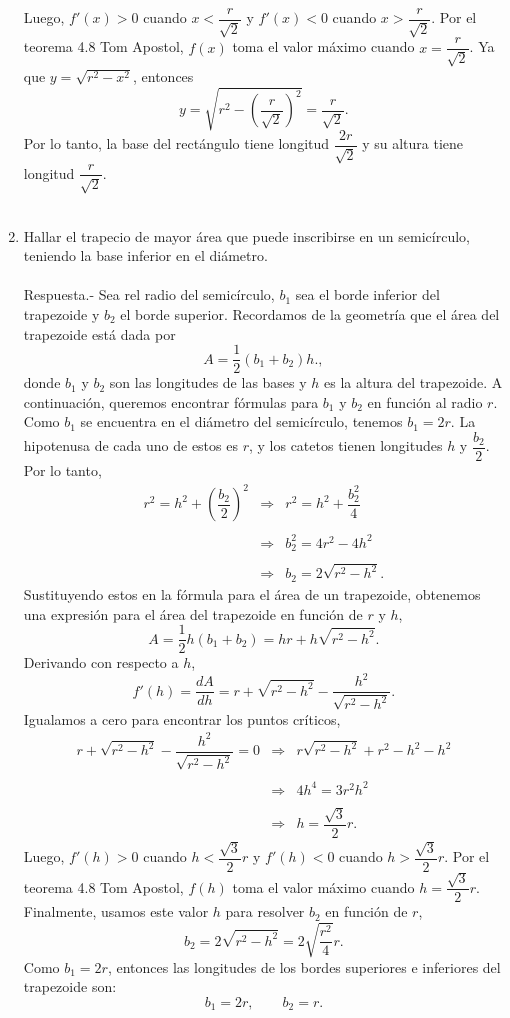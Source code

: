 \begin{enumerate}[\bfseries 1.]
	Luego, $f'(x)>0$ cuando $x<\dfrac{r}{\sqrt{2}}$ y $f'(x)<0$ cuando $x>\dfrac{r}{\sqrt{2}}$. Por el teorema 4.8 Tom Apostol, $f(x)$ toma el valor máximo cuando $x=\dfrac{r}{\sqrt{2}}$. 
	Ya que $y=\sqrt{r^2-x^2}$, entonces 
	$$y=\sqrt{r^2-\left(\dfrac{r}{\sqrt{2}}\right)^2}=\dfrac{r}{\sqrt{2}}.$$
	Por lo tanto, la base del rectángulo tiene longitud $\dfrac{2r}{\sqrt{2}}$ y su altura tiene longitud $\dfrac{r}{\sqrt{2}}$.\\\\


    \item Hallar el trapecio de mayor área que puede inscribirse en un semicírculo, teniendo la base inferior en el diámetro.\\\\
	Respuesta.-\; Sea rel radio del semicírculo, $b_1$ sea el borde inferior del trapezoide y $b_2$ el borde superior. Recordamos de la geometría que el área del trapezoide está dada por
	$$A=\dfrac{1}{2}(b_1+b_2)h.,$$
	donde $b_1$ y $b_2$ son las longitudes de las bases y $h$ es la altura del trapezoide. A continuación, queremos encontrar fórmulas para $b_1$ y $b_2$ en función al radio $r$. Como $b_1$ se encuentra en el diámetro del semicírculo, tenemos $b_1 = 2r$. La hipotenusa de cada uno de estos es $r$, y los catetos tienen longitudes $h$ y $\dfrac{b_2}{2}$. Por lo tanto, 
	$$\begin{array}{rcl}
	    r^2=h^2+\left(\dfrac{b_2}{2}\right)^2 & \Rightarrow & r^2=h^2+\dfrac{b_2^2}{4}\\\\
						  & \Rightarrow & b_2^2=4r^2-4h^2\\\\
						  & \Rightarrow & b_2=2\sqrt{r^2-h^2}.
	\end{array}$$
	Sustituyendo estos en la fórmula para el área de un trapezoide, obtenemos una expresión para el área del trapezoide en función de $r$ y $h$,
	$$A=\dfrac{1}{2}h(b_1+b_2)=hr+h\sqrt{r^2-h^2}.$$
	Derivando con respecto a $h$,
	$$f'(h)=\dfrac{dA}{dh}=r+\sqrt{r^2-h^2}-\dfrac{h^2}{\sqrt{r^2-h^2}}.$$
	Igualamos a cero para encontrar los puntos críticos,
	$$\begin{array}{rcl}
	    r+\sqrt{r^2-h^2}-\dfrac{h^2}{\sqrt{r^2-h^2}}=0 &\Rightarrow& r\sqrt{r^2-h^2}+r^2-h^2-h^2\\\\
	    						      &\Rightarrow& 4h^4=3r^2h^2\\\\
							      &\Rightarrow& h=\dfrac{\sqrt{3}}{2}r.
	\end{array}$$
	Luego, $f'(h)>0$ cuando $h<\dfrac{\sqrt{3}}{2}r$ y $f'(h)<0$ cuando $h>\dfrac{\sqrt{3}}{2}r$. Por el teorema 4.8 Tom Apostol, $f(h)$ toma el valor máximo cuando $h=\dfrac{\sqrt{3}}{2}r$. Finalmente, usamos este valor $h$ para resolver $b_2$ en función de $r$,
	$$b_2=2\sqrt{r^2-h^2}=2\sqrt{\dfrac{r^2}{4}}r.$$
	Como $b_1=2r$, entonces las longitudes de los bordes superiores e inferiores del trapezoide son:
	$$b_1=2r,\qquad b_2=r.$$\\


\end{enumerate}
